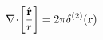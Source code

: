 \begin{equation}
{\bf \nabla}
\!
\cdot
\!
\left[
\frac{
\hat{\bf r}}{r}
\right]
=
2 \pi \delta^{(2)} ({\bf r})
\;
\label{eq:Gauss_2D}
\end{equation}

